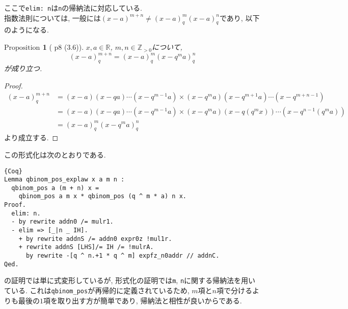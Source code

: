 \documentclass[11pt]{jsreport}
\theoremstyle{mystyle}
\newtheorem{prop}[df]{$\textrm{Proposition}$}
\newcommand{\bprop}{\begin{shadebox} \begin{prop}}
\newcommand{\eprop}{\end{prop} \end{shadebox}}
\newcommand{\bpf}{\begin{proof}}
\newcommand{\epf}{\end{proof}}
\newcommand{\Z}{\mathbb{Z}}
\newcommand{\R}{\mathbb{R}}
\newcommand{\0}{\textbf{0}}
\newcommand{\1}{\textbf{1}}
\newcommand{\2}{\textbf{2}}
\begin{document}
ここで{\tt elim:\,n}は{\tt n}の帰納法に対応している. \\
指数法則については, 一般には$(x - a)^{m + n} \neq (x - a)^m_q(x - a)^n_q$であり, 以下のようになる. 
\bprop[\cite{Kac} p8 (3.6)] \label{q_exp_low}
  $x,a\in\R$, $m,n\in\Z_{>0}$について, 
  \[
    (x-a)^{m+n}_q = (x-a)^m_q (x-q^ma)^n_q
  \]
  が成り立つ. 
\eprop
\bpf
  \begin{align*}
    (x-a)^{m+n}_q &= (x-a)(x-qa)\cdots(x-q^{m-1}a)
                         \times (x-q^ma)(x-q^{m+1}a)\cdots(x-q^{m+n-1})\\
                       &= (x-a)(x-qa)\cdots(x-q^{m-1}a)
                         \times (x-q^ma)(x-q(q^mx))\cdots(x-q^{n-1}(q^ma))\\
                       &= (x-a)^m_q(x-q^ma)^{n}_q
  \end{align*}
  より成立する.
\epf
この形式化は次のとおりである. 
\begin{lstlisting}{Coq}
Lemma qbinom_pos_explaw x a m n :
  qbinom_pos a (m + n) x =
    qbinom_pos a m x * qbinom_pos (q ^ m * a) n x.
Proof.
  elim: n.
  - by rewrite addn0 /= mulr1.
  - elim => [_|n _ IH].
    + by rewrite addnS /= addn0 expr0z !mul1r.
    + rewrite addnS [LHS]/= IH /= !mulrA.
      by rewrite -[q ^ n.+1 * q ^ m] expfz_n0addr // addnC.
Qed.
\end{lstlisting}
\cite{Kac}の証明では単に式変形しているが, 形式化の証明では{\tt m}, {\tt n}に関する帰納法を用いている. これは{\tt qbinom\_pos}が再帰的に定義されているため, $m$項と$n$項で分けるよりも最後の$1$項を取り出す方が簡単であり, 帰納法と相性が良いからである. 
\end{document}
